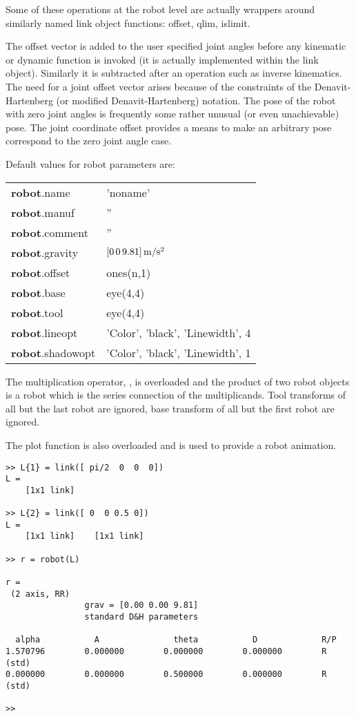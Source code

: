 \documentclass{article}
\newcommand{\mex}[1]{\hskip -1.25in 
{\hbox{\makebox[1.25in][l]{\Refon Examples}}}{#1}\vskip 0.25in}
\newcommand{\var}[1]{{\vtt #1}}
\begin{document}
{Some of these operations at the robot level are actually wrappers around
similarly named link object functions: \var{offset},
\var{qlim}, \var{islimit}.

The offset vector is added to the user specified joint angles before
any kinematic or dynamic function is invoked (it is actually implemented
within the link object).  Similarly it is subtracted after an operation
such as inverse kinematics.  The need for a joint offset vector arises
because of the constraints of the Denavit-Hartenberg (or modified
Denavit-Hartenberg) notation.  The pose of the robot with zero joint
angles is frequently some rather unusual (or even unachievable) pose.
The joint coordinate offset provides a means to make an arbitrary pose
correspond to the zero joint angle case.

Default values for robot parameters are:

\begin{center}
\begin{tabular}{ll}
\textbf{robot}.name    & 'noname' \\
\textbf{robot}.manuf   & '' \\
\textbf{robot}.comment & '' \\
\textbf{robot}.gravity & $ [0 \,0 \,9.81]\, {\rm m/s^2}$ \\
\textbf{robot}.offset    & \var{ones(n,1)} \\
\textbf{robot}.base    & \var{eye(4,4)} \\
\textbf{robot}.tool    & \var{eye(4,4)} \\
\textbf{robot}.lineopt  & 'Color', 'black', 'Linewidth', 4 \\
\textbf{robot}.shadowopt  & 'Color', 'black', 'Linewidth', 1
\end{tabular}
\end{center}

The multiplication operator, \var{*}, is overloaded and the product of two robot
objects is a robot which is the series connection of the multiplicands.
Tool transforms of all but the last robot are ignored, base transform of
all but the first robot are ignored.

The \var{plot} function is also overloaded and is used to provide a robot
animation.  
}

\mex{}
\begin{verbatim}
>> L{1} = link([ pi/2  0  0  0])
L = 
    [1x1 link]

>> L{2} = link([ 0  0 0.5 0])
L = 
    [1x1 link]    [1x1 link]

>> r = robot(L)

r = 
 (2 axis, RR)
                grav = [0.00 0.00 9.81]
                standard D&H parameters

  alpha           A               theta           D             R/P
1.570796        0.000000        0.000000        0.000000        R     (std)
0.000000        0.000000        0.500000        0.000000        R     (std)

>> 
\end{verbatim}
\end{document}
